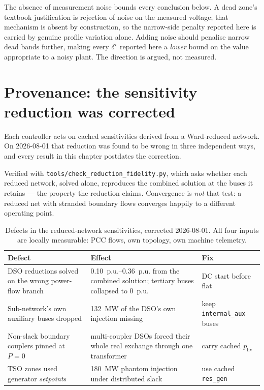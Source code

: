 \documentclass[11pt,a4paper]{article}
\newcommand{\pu}{\ensuremath{\mathrm{p.u.}}}
\newcommand{\dz}{\ensuremath{\delta}}
\begin{document}
The absence of measurement noise bounds every conclusion below. A dead zone's
textbook justification is rejection of noise on the measured voltage; that
mechanism is absent by construction, so the narrow-side penalty reported here is
carried by genuine profile variation alone. Adding noise should penalise narrow
dead bands further, making every $\dz^\star$ reported here a \emph{lower} bound
on the value appropriate to a noisy plant. The direction is argued, not measured.

\section{Provenance: the sensitivity reduction was corrected}
\label{sec:rev2}

Each controller acts on cached sensitivities derived from a Ward-reduced
network. On 2026-08-01 that reduction was found to be wrong in three
independent ways, and every result in this chapter postdates the correction.

Verified with \texttt{tools/check\_reduction\_fidelity.py}, which asks whether
each reduced network, solved alone, reproduces the combined solution at the
buses it retains --- the property the reduction claims. Convergence is
\emph{not} that test: a reduced net with stranded boundary flows converges
happily to a different operating point.

\begin{table}[htbp]
\centering
\begin{tabular}{lll}
\toprule
Defect & Effect & Fix \\
\midrule
DSO reductions solved on the wrong power-flow branch
  & \SIrange{0.10}{0.36}{\pu} from the combined solution; tertiary buses
    collapsed to \SI{0}{\pu}
  & DC start before flat \\
Sub-network's own auxiliary buses dropped
  & \SI{132}{\mega\watt} of the DSO's own injection missing
  & keep \texttt{internal\_aux} buses \\
Non-slack boundary couplers pinned at $P=0$
  & multi-coupler DSOs forced their whole real exchange through one transformer
  & carry cached $p_\mathrm{hv}$ \\
TSO zones used generator \emph{setpoints}
  & \SI{180}{\mega\watt} phantom injection under distributed slack
  & use cached \texttt{res\_gen} \\
\bottomrule
\end{tabular}
\caption{Defects in the reduced-network sensitivities, corrected 2026-08-01.
All four inputs are locally measurable: PCC flows, own topology, own machine
telemetry.}
\end{table}
\end{document}
